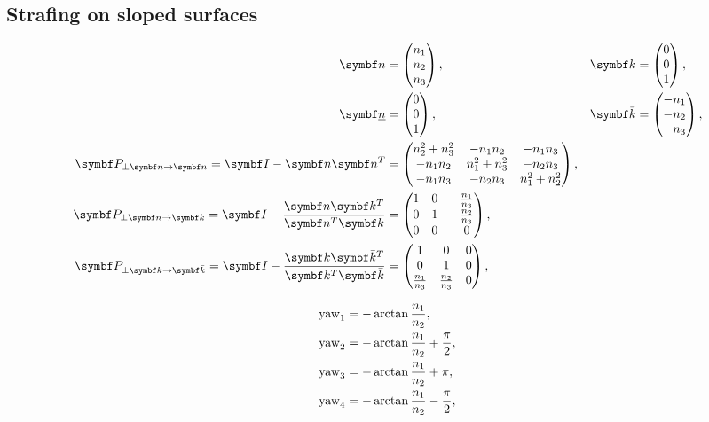 \subsection{Strafing on sloped surfaces}
\begin{align*}
\vec{n} &=
\begin{pmatrix}
n_1\\n_2\\n_3
\end{pmatrix}, & \vec{k} &=
\begin{pmatrix}
0\\0\\1
\end{pmatrix},\\
\vec{\flat{n}} &=
\begin{pmatrix}
0\\0\\1
\end{pmatrix}, &
\vec{\bar{k}} &=
\begin{pmatrix}
-n_1\\-n_2\\\hphantom{-}n_3
\end{pmatrix},\\
%
\mat{P}_{\perp \vec{n} \rightarrow \vec{n}} = \mat{I} - \vec{n}\vec{n}^T &=
\begin{pmatrix}
n_2^2+n_3^2 & -n_1 n_2 & -n_1 n_3\\
-n_1 n_2 & n_1^2+n_3^2 & -n_2 n_3\\
-n_1 n_3 & -n_2 n_3 & n_1^2+n_2^2
\end{pmatrix},\\
\mat{P}_{\perp \vec{n} \rightarrow \vec{k}} = \mat{I} - \frac{\vec{n}\vec{k}^T}{\vec{n}^T\vec{k}} &=
\begin{pmatrix}
1 & 0 & -\frac{n_1}{n_3}\\
0 & 1 & -\frac{n_2}{n_3}\\
0 & 0 & \hphantom{-}0
\end{pmatrix},\\
\mat{P}_{\perp \vec{k} \rightarrow \vec{\bar{k}}} = \mat{I} - \frac{\vec{k}\vec{\bar{k}}^T}{\vec{k}^T\vec{\bar{k}}} &=
\begin{pmatrix}
1 & 0 & 0\\
0 & 1 & 0\\
\frac{n_1}{n_3} & \frac{n_2}{n_3} & 0
\end{pmatrix},
\end{align*}

\begin{align*}
\operatorname{yaw}_1 &= -\arctan\frac{n_1}{n_2},\\
\operatorname{yaw}_2 &= -\arctan\frac{n_1}{n_2} + \frac{\pi}{2},\\
\operatorname{yaw}_3 &= -\arctan\frac{n_1}{n_2} + \pi,\\
\operatorname{yaw}_4 &= -\arctan\frac{n_1}{n_2} - \frac{\pi}{2},
\end{align*}

